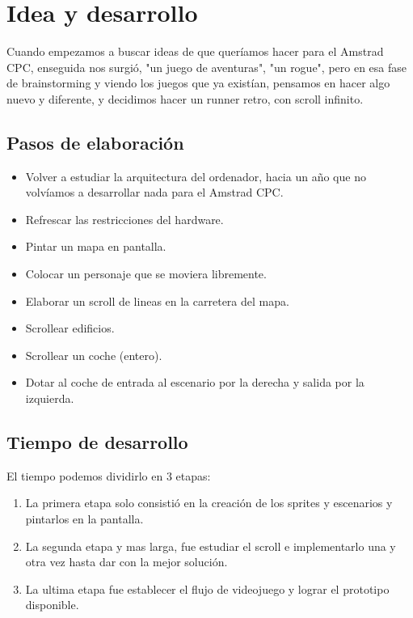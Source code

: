 \documentclass[11pt, spanish]{article}
\begin{document}
\section{Idea y desarrollo}
Cuando empezamos a buscar ideas de que queríamos hacer para el Amstrad CPC, enseguida nos surgió, "un juego de aventuras", "un rogue", pero en esa fase de brainstorming y viendo los juegos que ya existían, pensamos en hacer algo nuevo y diferente, y decidimos hacer un runner retro, con scroll infinito.
 
\subsection{Pasos de elaboración}
\begin{itemize}
	\item Volver a estudiar la arquitectura del ordenador, hacia un año que no volvíamos a desarrollar nada para el Amstrad CPC.
	\item Refrescar las restricciones del hardware.
	\item Pintar un mapa en pantalla.
	\item Colocar un personaje que se moviera libremente.
	\item Elaborar un scroll de lineas en la carretera del mapa.
	\item Scrollear edificios.
	\item Scrollear un coche (entero).
	\item Dotar al coche de entrada al escenario por la derecha y salida por la izquierda.
\end{itemize}

\subsection{Tiempo de desarrollo}
El tiempo podemos dividirlo en 3 etapas:
\begin{enumerate}
	\item La primera etapa solo consistió en la creación de los sprites y escenarios y pintarlos en la pantalla.
	\item La segunda etapa y mas larga, fue estudiar el scroll e implementarlo una y otra vez hasta dar con la mejor solución.
	\item La ultima etapa fue establecer el flujo de videojuego y lograr el prototipo disponible.
\end{enumerate}
\end{document}
